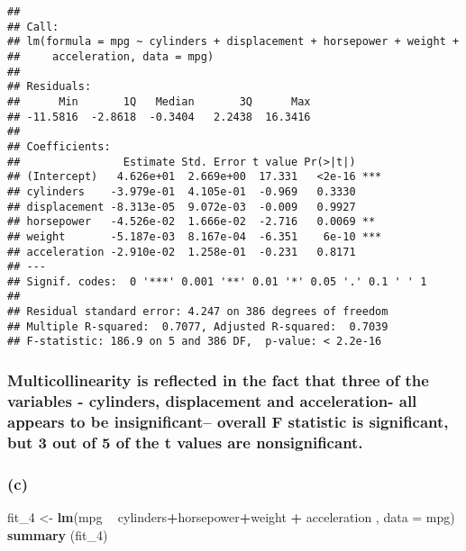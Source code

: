 \documentclass[
]{article}
\newenvironment{Shaded}{\begin{snugshade}}{\end{snugshade}}
\newcommand{\DataTypeTok}[1]{\textcolor[rgb]{0.13,0.29,0.53}{#1}}
\newcommand{\DecValTok}[1]{\textcolor[rgb]{0.00,0.00,0.81}{#1}}
\newcommand{\KeywordTok}[1]{\textcolor[rgb]{0.13,0.29,0.53}{\textbf{#1}}}
\newcommand{\NormalTok}[1]{#1}
\newcommand{\OperatorTok}[1]{\textcolor[rgb]{0.81,0.36,0.00}{\textbf{#1}}}
\newcommand{\StringTok}[1]{\textcolor[rgb]{0.31,0.60,0.02}{#1}}
\begin{document}
\begin{verbatim}
## 
## Call:
## lm(formula = mpg ~ cylinders + displacement + horsepower + weight + 
##     acceleration, data = mpg)
## 
## Residuals:
##      Min       1Q   Median       3Q      Max 
## -11.5816  -2.8618  -0.3404   2.2438  16.3416 
## 
## Coefficients:
##                Estimate Std. Error t value Pr(>|t|)    
## (Intercept)   4.626e+01  2.669e+00  17.331   <2e-16 ***
## cylinders    -3.979e-01  4.105e-01  -0.969   0.3330    
## displacement -8.313e-05  9.072e-03  -0.009   0.9927    
## horsepower   -4.526e-02  1.666e-02  -2.716   0.0069 ** 
## weight       -5.187e-03  8.167e-04  -6.351    6e-10 ***
## acceleration -2.910e-02  1.258e-01  -0.231   0.8171    
## ---
## Signif. codes:  0 '***' 0.001 '**' 0.01 '*' 0.05 '.' 0.1 ' ' 1
## 
## Residual standard error: 4.247 on 386 degrees of freedom
## Multiple R-squared:  0.7077, Adjusted R-squared:  0.7039 
## F-statistic: 186.9 on 5 and 386 DF,  p-value: < 2.2e-16
\end{verbatim}

\hypertarget{multicollinearity-is-reflected-in-the-fact-that-three-of-the-variables---cylinders-displacement-and-acceleration--all-appears-to-be-insignificant-overall-f-statistic-is-significant-but-3-out-of-5-of-the-t-values-are-nonsignificant.}{%
\subsubsection{Multicollinearity is reflected in the fact that three of
the variables - cylinders, displacement and acceleration- all appears to
be insignificant-- overall F statistic is significant, but 3 out of 5 of
the t values are
nonsignificant.}\label{multicollinearity-is-reflected-in-the-fact-that-three-of-the-variables---cylinders-displacement-and-acceleration--all-appears-to-be-insignificant-overall-f-statistic-is-significant-but-3-out-of-5-of-the-t-values-are-nonsignificant.}}

\hypertarget{c}{%
\subsubsection{(c)}\label{c}}

\begin{Shaded}
\begin{Highlighting}[]
\NormalTok{fit_}\DecValTok{4}\NormalTok{ <-}\StringTok{ }\KeywordTok{lm}\NormalTok{(mpg }\OperatorTok{~}\StringTok{ }\NormalTok{cylinders}\OperatorTok{+}\NormalTok{horsepower}\OperatorTok{+}\NormalTok{weight }\OperatorTok{+}\StringTok{ }\NormalTok{acceleration , }\DataTypeTok{data =}\NormalTok{ mpg)}
\KeywordTok{summary}\NormalTok{ (fit_}\DecValTok{4}\NormalTok{)}
\end{Highlighting}
\end{Shaded}
\end{document}
